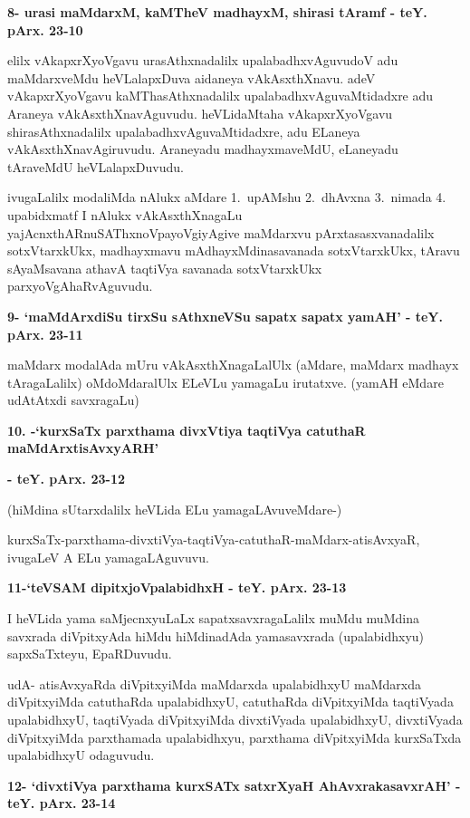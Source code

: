 \medskip
\noindent
\textbf{8- urasi maMdarxM, kaMTheV madhayxM, shirasi tAramf - teY. pArx. 23-10}

\smallskip
elilx vAkapxrXyoVgavu urasAthxnadalilx upalabadhxvAguvudoV adu maMdarx\-veMdu heVLalapxDuva aida\-neya vAkAsxthXnavu. adeV vAkapxrXyoVgavu kaMThasAthxnadalilx upalabadhxvAguvaMtidadxre adu Araneya vAkAsxthX\-na\-vAguvudu. heVLidaMtaha vAkapxrXyoVgavu shirasAthxnadalilx upalabadhxvAguvaMtidadxre, adu ELaneya vAkAsxthXna\-vAgiruvudu. Araneyadu madhayxmaveMdU, eLaneyadu tAraveMdU heVLalapxDuvudu.

ivugaLalilx modaliMda nAlukx aMdare 1.~upAMshu 2.~dhAvxna 3.~\hbox{nimada} 4. upabidxmatf I nAlukx vAkAsxthXnagaLu yajAcnxthARnuSAThxnoVpayoVgiyAgive maMdarxvu pArxtasasxvanadalilx sotxVtarxkUkx, madhayx\-mavu mAdhayxMdinasavanada sotxVtarxkUkx, tAravu sAyaMsavana athavA taqtiVya savanada sotxVtarxkUkx parxyoV\-gAhaRvAgu\-vudu.

\medskip
\noindent
\textbf{9- `maMdArxdiSu tirxSu sAthxneVSu sapatx sapatx yamAH' - teY. pArx. 23-11}

\smallskip
maMdarx modalAda mUru vAkAsxthXnagaLalUlx (aMdare, maMdarx madhayx tAragaLalilx) oMdoMdaralUlx ELeVLu yamagaLu irutatxve. (yamAH eMdare udAtAtxdi savxragaLu)


\medskip
\noindent
\textbf{10. -`kurxSaTx parxthama divxVtiya taqtiVya catuthaR maMdArxtisAvxyARH'}

\textbf{- teY. pArx. 23-12}

\smallskip
(hiMdina sUtarxdalilx heVLida ELu yamagaLAvuveMdare-)

kurxSaTx-parxthama-divxtiVya-taqtiVya-catuthaR-maMdarx-atisAvxyaR, ivugaLeV A ELu yamagaLAgu\-vuvu.

\eject

\noindent
\textbf{11-`teVSAM dipitxjoVpalabidhxH - teY. pArx. 23-13}

\smallskip
I heVLida yama saMjecnxyuLaLx sapatxsavxragaLalilx muMdu muMdina savxrada diVpitx\-yAda hiMdu hiMdina\-dAda yamasavxrada (upalabidhxyu) sapxSaTxteyu, EpaRDu\-vudu. 

udA- atisAvxyaRda diVpitx\-yiMda maMdarxda upalabidhxyU maMdarxda diVpitxyiMda catuthaRda upalabidhxyU, catuthaRda diVpitxyiMda taqtiV\-yada upalabidhxyU, taqtiVyada diVpitxyiMda divxtiVyada upalabidhxyU, divxtiVyada diVpitx\-yiMda parxtha\-mada upalabidhxyu, parxthama diVpitxyiMda kurxSaTxda upalabidhxyU odaguvudu.

\medskip
\noindent
\textbf{12- `divxtiVya parxthama kurxSATx satxrXyaH AhAvxrakasavxrAH' - teY. pArx. 23-14}

